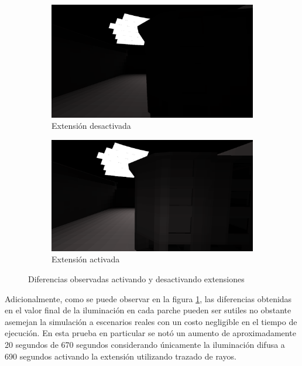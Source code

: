 \begin{figure}[htbp]
	\centering
	\begin{subfigure}{0.47\textwidth}
		\includegraphics[width=1\linewidth]{assets/streete}
		\caption{Extensión desactivada}
	\end{subfigure}
	\begin{subfigure}{0.47\textwidth}
		\includegraphics[width=1\linewidth]{assets/streets}
		\caption{Extensión activada}
	\end{subfigure}
	\caption{Diferencias observadas activando y desactivando extensiones}
	\label{img:difspecstreet}
\end{figure}

Adicionalmente, como se puede observar en la figura \ref{img:difspecstreet}, las diferencias obtenidas en el valor final de la iluminación en cada parche pueden ser sutiles no obstante asemejan la simulación a escenarios reales con un costo negligible en el tiempo de ejecución. En esta prueba en particular se notó un aumento de aproximadamente 20 segundos de 670 segundos considerando únicamente la iluminación difusa a 690 segundos activando la extensión utilizando trazado de rayos.

